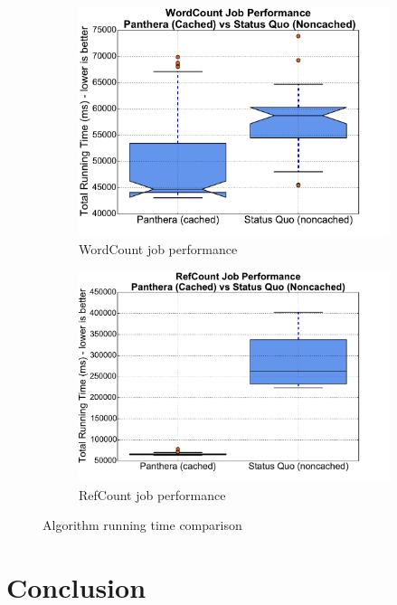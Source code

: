 \documentclass[12pt]{article}
\begin{document}
\begin{figure}
\centering
\begin{subfigure}{.5\textwidth}
  \centering
  \includegraphics[scale=0.3]{assets/v2/wordcount_boxplot.pdf}
  \caption{WordCount job performance}
  \label{fig:sub1}
\end{subfigure}%
\begin{subfigure}{.5\textwidth}
  \centering
  \includegraphics[scale=0.3]{assets/v2/refgetter_boxplot.pdf}
  \caption{RefCount job performance}
  \label{refgetter}
\end{subfigure}
\caption{Algorithm running time comparison}
\label{fig:test}
\end{figure}

\section{Conclusion}
\end{document}
